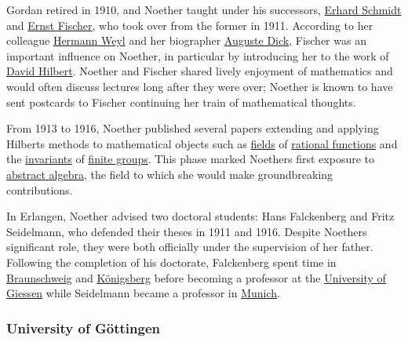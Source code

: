 Gordan retired in 1910, and Noether taught under his successors, \href{https://en.wikipedia.org/wiki/Erhard_Schmidt}{Erhard Schmidt} and \href{https://en.wikipedia.org/wiki/Ernst_Sigismund_Fischer}{Ernst Fischer}, who took over from the former in 1911. According to her colleague \href{https://en.wikipedia.org/wiki/Hermann_Weyl}{Hermann Weyl} and her biographer \href{https://en.wikipedia.org/wiki/Auguste_Dick}{Auguste Dick}, Fischer was an important influence on Noether, in particular by introducing her to the work of \href{https://en.wikipedia.org/wiki/David_Hilbert}{David Hilbert}. Noether and Fischer shared lively enjoyment of mathematics and would often discuss lectures long after they were over; Noether is known to have sent postcards to Fischer continuing her train of mathematical thoughts.

From 1913 to 1916, Noether published several papers extending and applying Hilbert\textquotesingle s methods to mathematical objects such as \href{https://en.wikipedia.org/wiki/Field_(mathematics)}{fields} of \href{https://en.wikipedia.org/wiki/Rational_function}{rational functions} and the \href{https://en.wikipedia.org/wiki/Invariant_theory}{invariants} of \href{https://en.wikipedia.org/wiki/Finite_group}{finite groups}. This phase marked Noether\textquotesingle s first exposure to \href{https://en.wikipedia.org/wiki/Abstract_algebra}{abstract algebra}, the field to which she would make groundbreaking contributions.

In Erlangen, Noether advised two doctoral students: Hans Falckenberg and Fritz Seidelmann, who defended their theses in 1911 and 1916. Despite Noether\textquotesingle s significant role, they were both officially under the supervision of her father. Following the completion of his doctorate, Falckenberg spent time in \href{https://en.wikipedia.org/wiki/Braunschweig}{Braunschweig} and \href{https://en.wikipedia.org/wiki/Königsberg}{Königsberg} before becoming a professor at the \href{https://en.wikipedia.org/wiki/University_of_Giessen}{University of Giessen} while Seidelmann became a professor in \href{https://en.wikipedia.org/wiki/Munich}{Munich}.


\subsubsection[University of Göttingen]{\texorpdfstring{\protect\hypertarget{University_of_G.C3.B6ttingen}{}{}University of Göttingen}{University of Göttingen}}\label{University_of_Guxf6ttingen}


